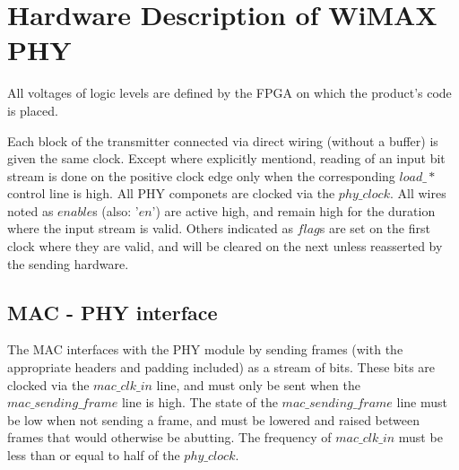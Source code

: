 \documentclass[10pt]{article}
\begin{document}

\section{Hardware Description of WiMAX PHY}
All voltages of logic levels are defined by the FPGA on which the product's
code is placed.

Each block of the transmitter connected via direct wiring (without a buffer)
is given the same clock. Except where explicitly mentiond, reading of an input
bit stream is done on the positive clock edge only when the corresponding
$load\_*$ control line is high. All PHY componets are clocked via the
$phy\_clock$. All wires noted as $enable$s (also: '$en$') are active high, and
remain high for the duration where the input stream is valid. Others indicated
as $flag$s are set on the first clock where they are valid, and will be
cleared on the next unless reasserted by the sending hardware.

	\subsection{MAC - PHY interface}
	\label{sec:mac_phy}
	The MAC interfaces with the PHY module by sending frames (with the
	appropriate headers and padding included) as a stream of bits. These
	bits are clocked via the $mac\_clk\_in$ line, and must only be sent
	when the $mac\_sending\_frame$ line is high. The state of the
	$mac\_sending\_frame$ line must be low when not sending a frame, and
	must be lowered and raised between frames that would otherwise be
	abutting. The frequency of $mac\_clk\_in$ must be less than or equal
	to half of the $phy\_clock$.
\end{document}
